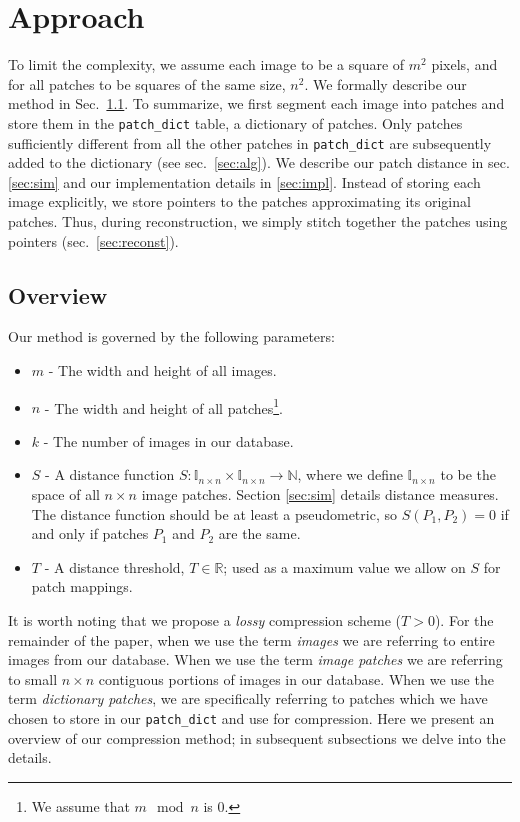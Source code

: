 \section{Approach}\label{sec:method}

To limit the complexity, we assume
each image to be a square of $m^2$ pixels, and for all patches to
be squares of the same size, $n^2$.
We formally describe our method in Sec.~\ref{sec:overview}. To summarize,
we first segment each image into patches and store them in the \texttt{patch\_dict} table, a dictionary of patches.
Only patches sufficiently different
from all the other patches in \texttt{patch\_dict} are subsequently added to the dictionary (see sec.~\ref{sec:alg}).
We describe our patch distance in sec. \ref{sec:sim} and our implementation details in \ref{sec:impl}.
Instead of storing each image explicitly, we store pointers to the patches approximating its original patches. 
Thus, during reconstruction, we simply stitch together the patches using pointers (sec.~\ref{sec:reconst}).

\subsection{Overview}
\label{sec:overview}

Our method is governed by the following parameters:
\begin{itemize}
\item $m$ - The width and height of all images.
\item $n$ - The width and height of all patches\footnote{We assume that $m \mod n$ is $0$.}.
\item $k$ - The number of images in our database.
\item $S$ - A distance function $S \colon \mathds{I}_{n \times n} \times \mathds{I}_{n \times n} \to \mathds{N}$, where we define $\mathds{I}_{n \times n}$ to be the space of all $n \times n$ image patches.  Section \ref{sec:sim} details distance measures.  The distance function should be at least a pseudometric, so $S(P_1, P_2) = 0$ if and only if patches $P_1$ and $P_2$ are the same.
\item $T$ - A distance threshold, $T \in \mathds{R}$; used as a maximum value we allow on $S$ for patch mappings.

\end{itemize}

It is worth noting that we propose a \emph{lossy} compression scheme ($T > 0$).  For the remainder of the paper, when we use the term \emph{images} we are referring to entire images from our database.  When we use the term \emph{image patches} we are referring to small $n \times n$ contiguous portions of images in our database.  When we use the term \emph{dictionary patches}, we are specifically referring to patches which we have chosen to store in our \texttt{patch\_dict} and use for compression.  Here we present an overview of our compression method; in subsequent subsections we delve into the details.

